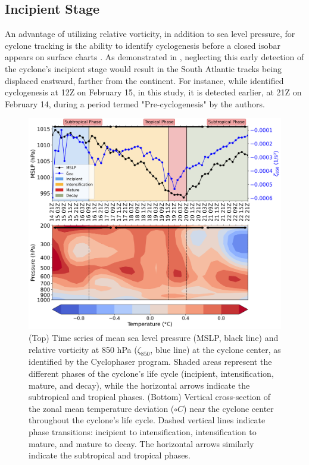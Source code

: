 \documentclass[pdflatex,sn-chicago]{sn-jnl}%
\theoremstyle{plain}
\theoremstyle{definition}
\theoremstyle{remark}
\theoremstyle{definition}
\begin{document}
\subsection{Incipient Stage}

An advantage of utilizing relative vorticity, in addition to sea level pressure, for cyclone tracking is the ability to identify cyclogenesis before a closed isobar appears on surface charts \citep[e.g.,][]{sinclair1994objective,gramcianinov2019properties}. As demonstrated in \citet{couto2024new}, neglecting this early detection of the cyclone's incipient stage would result in the South Atlantic tracks being displaced eastward, farther from the continent. For instance, while \citet{reboita2024assessment} identified cyclogenesis at 12Z on February 15, in this study, it is detected earlier, at 21Z on February 14, during a period termed "Pre-cyclogenesis" by the authors.

\begin{figure}[h!]
    \centering
    \includegraphics[width=\textwidth]{combined_serie_zonaldeviation.png}
    \caption{(Top) Time series of mean sea level pressure (MSLP, black line) and relative vorticity at 850 hPa ($\zeta_{850}$, blue line) at the cyclone center, as identified by the Cyclophaser program. Shaded areas represent the different phases of the cyclone's life cycle (incipient, intensification, mature, and decay), while the horizontal arrows indicate the subtropical and tropical phases. (Bottom) Vertical cross-section of the zonal mean temperature deviation ($\circ C$) near the cyclone center throughout the cyclone's life cycle. Dashed vertical lines indicate phase transitions: incipient to intensification, intensification to mature, and mature to decay. The horizontal arrows similarly indicate the subtropical and tropical phases.}
    \label{fig:combined_serie_zonaldeviation}
\end{figure}
\end{document}
